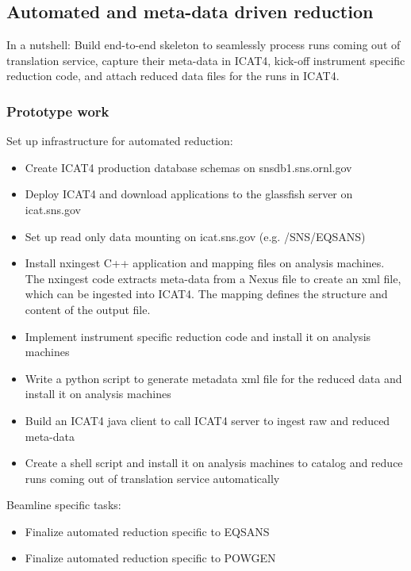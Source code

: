 \subsection{Automated and meta-data driven reduction}

In a nutshell: Build end-to-end skeleton to seamlessly process runs coming out of translation service, capture their meta-data in ICAT4, kick-off instrument specific reduction code, and attach reduced data files for the runs in ICAT4.

\subsubsection{Prototype work}
Set up infrastructure for automated reduction:
\begin{itemize}
\item Create ICAT4 production database schemas on snsdb1.sns.ornl.gov
\item Deploy ICAT4 and download applications to the glassfish server on icat.sns.gov
\item Set up read only data mounting on icat.sns.gov (e.g. /SNS/EQSANS) 
\item Install nxingest C++ application and mapping files on analysis machines. The nxingest code extracts meta-data from a Nexus file to create an xml file, which can be ingested into ICAT4. The mapping defines the structure and content of the output file.
\item Implement instrument specific reduction code and install it on analysis machines
\item Write a python script to generate metadata xml file for the reduced data and install it on analysis machines
\item Build an ICAT4 java client to call ICAT4 server to ingest raw and reduced meta-data
\item Create a shell script and install it on analysis machines to catalog and reduce runs coming out of translation service automatically
\end{itemize}
Beamline specific tasks:
\begin{itemize}
\item Finalize automated reduction specific to EQSANS
\item Finalize automated reduction specific to POWGEN
\end{itemize}

